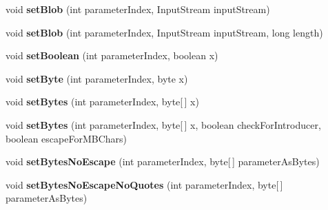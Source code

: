 \begin{DoxyCompactItemize}
\mbox{\label{interfacecom_1_1mysql_1_1cj_1_1_query_bindings_a612b7175f9fd75d62624a40f3f626b19}} 
void {\bfseries set\+Blob} (int parameter\+Index, Input\+Stream input\+Stream)
\item 
\mbox{\label{interfacecom_1_1mysql_1_1cj_1_1_query_bindings_adfb912cfb12379cfdf4eea6833fb7e7d}} 
void {\bfseries set\+Blob} (int parameter\+Index, Input\+Stream input\+Stream, long length)
\item 
\mbox{\label{interfacecom_1_1mysql_1_1cj_1_1_query_bindings_a0aba845fabc0265eda0a056bd87e21d8}} 
void {\bfseries set\+Boolean} (int parameter\+Index, boolean x)
\item 
\mbox{\label{interfacecom_1_1mysql_1_1cj_1_1_query_bindings_a16cd7806599dbe59b5cb7730d1b94a92}} 
void {\bfseries set\+Byte} (int parameter\+Index, byte x)
\item 
\mbox{\label{interfacecom_1_1mysql_1_1cj_1_1_query_bindings_afe53c908490903fa6c9b340b7b435a3d}} 
void {\bfseries set\+Bytes} (int parameter\+Index, byte\mbox{[}$\,$\mbox{]} x)
\item 
\mbox{\label{interfacecom_1_1mysql_1_1cj_1_1_query_bindings_a43eed8e96b28e5ff529eb6eb25e01bc7}} 
void {\bfseries set\+Bytes} (int parameter\+Index, byte\mbox{[}$\,$\mbox{]} x, boolean check\+For\+Introducer, boolean escape\+For\+M\+B\+Chars)
\item 
\mbox{\label{interfacecom_1_1mysql_1_1cj_1_1_query_bindings_aa92daa6a1d23b167bc0400bfa3a82012}} 
void {\bfseries set\+Bytes\+No\+Escape} (int parameter\+Index, byte\mbox{[}$\,$\mbox{]} parameter\+As\+Bytes)
\item 
\mbox{\label{interfacecom_1_1mysql_1_1cj_1_1_query_bindings_aa6db593647f534f2788e3b8da618b9c2}} 
void {\bfseries set\+Bytes\+No\+Escape\+No\+Quotes} (int parameter\+Index, byte\mbox{[}$\,$\mbox{]} parameter\+As\+Bytes)

\end{DoxyCompactItemize}
